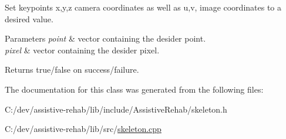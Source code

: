 Set keypoint\textquotesingle{}s x,y,z camera coordinates as well as u,v, image coordinates to a desired value. 


\begin{DoxyParams}{Parameters}
{\em point} & vector containing the desider point. \\
\hline
{\em pixel} & vector containing the desider pixel. \\
\hline
\end{DoxyParams}
\begin{DoxyReturn}{Returns}
true/false on success/failure. 
\end{DoxyReturn}


The documentation for this class was generated from the following files\+:\begin{DoxyCompactItemize}
\item 
C\+:/dev/assistive-\/rehab/lib/include/\+Assistive\+Rehab/skeleton.\+h\item 
C\+:/dev/assistive-\/rehab/lib/src/\mbox{\hyperlink{skeleton_8cpp}{skeleton.\+cpp}}\end{DoxyCompactItemize}
